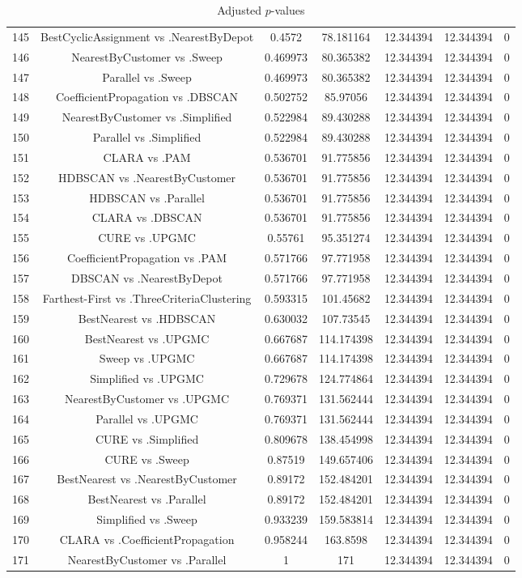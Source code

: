\documentclass[a4paper,10pt]{article}
\begin{document}
\begin{landscape}
\begin{table}[!htp]
\begin{tabular}{ccccccc}
145&BestCyclicAssignment vs .NearestByDepot&0.4572&78.181164&12.344394&12.344394&0\\
146&NearestByCustomer vs .Sweep&0.469973&80.365382&12.344394&12.344394&0\\
147&Parallel vs .Sweep&0.469973&80.365382&12.344394&12.344394&0\\
148&CoefficientPropagation vs .DBSCAN&0.502752&85.97056&12.344394&12.344394&0\\
149&NearestByCustomer vs .Simplified&0.522984&89.430288&12.344394&12.344394&0\\
150&Parallel vs .Simplified&0.522984&89.430288&12.344394&12.344394&0\\
151&CLARA vs .PAM&0.536701&91.775856&12.344394&12.344394&0\\
152&HDBSCAN vs .NearestByCustomer&0.536701&91.775856&12.344394&12.344394&0\\
153&HDBSCAN vs .Parallel&0.536701&91.775856&12.344394&12.344394&0\\
154&CLARA vs .DBSCAN&0.536701&91.775856&12.344394&12.344394&0\\
155&CURE vs .UPGMC&0.55761&95.351274&12.344394&12.344394&0\\
156&CoefficientPropagation vs .PAM&0.571766&97.771958&12.344394&12.344394&0\\
157&DBSCAN vs .NearestByDepot&0.571766&97.771958&12.344394&12.344394&0\\
158&Farthest-First vs .ThreeCriteriaClustering&0.593315&101.45682&12.344394&12.344394&0\\
159&BestNearest vs .HDBSCAN&0.630032&107.73545&12.344394&12.344394&0\\
160&BestNearest vs .UPGMC&0.667687&114.174398&12.344394&12.344394&0\\
161&Sweep vs .UPGMC&0.667687&114.174398&12.344394&12.344394&0\\
162&Simplified vs .UPGMC&0.729678&124.774864&12.344394&12.344394&0\\
163&NearestByCustomer vs .UPGMC&0.769371&131.562444&12.344394&12.344394&0\\
164&Parallel vs .UPGMC&0.769371&131.562444&12.344394&12.344394&0\\
165&CURE vs .Simplified&0.809678&138.454998&12.344394&12.344394&0\\
166&CURE vs .Sweep&0.87519&149.657406&12.344394&12.344394&0\\
167&BestNearest vs .NearestByCustomer&0.89172&152.484201&12.344394&12.344394&0\\
168&BestNearest vs .Parallel&0.89172&152.484201&12.344394&12.344394&0\\
169&Simplified vs .Sweep&0.933239&159.583814&12.344394&12.344394&0\\
170&CLARA vs .CoefficientPropagation&0.958244&163.8598&12.344394&12.344394&0\\
171&NearestByCustomer vs .Parallel&1&171&12.344394&12.344394&0\\
\hline
\end{tabular}
\caption{Adjusted $p$-values}
\end{table}

\end{landscape}
\end{document}
